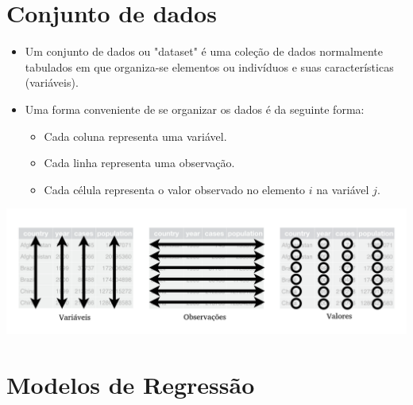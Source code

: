 \documentclass[10pt,
  aspectratio=169,
  serif,
  mathserif,
  professionalfont,
  compress,
  handout,
  ]{beamer}\usepackage[]{graphicx}\usepackage[]{color}
\begin{document}

\section{Conjunto de dados}

\begin{frame}[c, allowframebreaks]

\begin{itemize}
  \item Um conjunto de dados ou "dataset" é uma coleção de dados normalmente tabulados em que organiza-se elementos ou indivíduos e suas características (variáveis). 

  \item Uma forma conveniente de se organizar os dados é da seguinte forma:
    \begin{itemize}
      \item Cada coluna representa uma variável.
      \item Cada linha representa uma observação.
      \item Cada célula representa o valor observado no elemento $i$ na variável $j$.
    \end{itemize}
\end{itemize}

\includegraphics[width=\textwidth]{img/tidy-data_t.png}

\end{frame}


\section{Modelos de Regressão}
\end{document}
